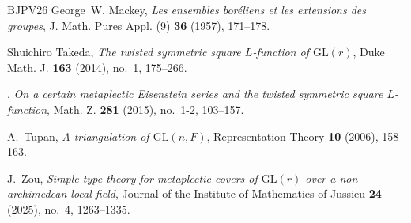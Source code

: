 \documentclass[11pt, a4paper, reqno]{amsart}
\theoremstyle{definition}
\theoremstyle{remark}
\theoremstyle{example}
\theoremstyle{note}
\numberwithin{equation}{section}
\begin{document}
\begin{thebibliography}{BJPV26}
George~W. Mackey, \emph{Les ensembles bor\'{e}liens et les extensions des groupes}, J. Math. Pures Appl. (9) \textbf{36} (1957), 171--178. 

Shuichiro Takeda, \emph{The twisted symmetric square {$L$}-function of $\mathrm{GL}(r)$}, Duke Math. J. \textbf{163} (2014), no.~1, 175--266. 

\bysame, \emph{On a certain metaplectic {E}isenstein series and the twisted symmetric square {$L$}-function}, Math. Z. \textbf{281} (2015), no.~1-2, 103--157. 

A.~Tupan, \emph{A triangulation of {$\mathrm{GL}(n,F)$}}, Representation Theory \textbf{10} (2006), 158--163.

J.~Zou, \emph{Simple type theory for metaplectic covers of {$\mathrm{GL}(r)$} over a non-archimedean local field}, Journal of the Institute of Mathematics of Jussieu \textbf{24} (2025), no.~4, 1263--1335.

\end{thebibliography}



%
%
\end{document}
